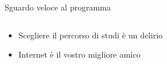 \documentclass[aspectratio=1610]{beamer}
\begin{document}
\begin{frame}{Sguardo veloce al programma}
{\begin{columns}
\begin{column}{0.4\textwidth}
\begin{figure}
					\end{figure}
					\vfill
					\begin{itemize}
						\item<7-> Scegliere il percorso di studi è un delirio
						\item<8-> Internet è il vostro migliore amico
					\end{itemize}
				\end{column}
				\end{columns}
		}
	\end{frame}
\end{document}
